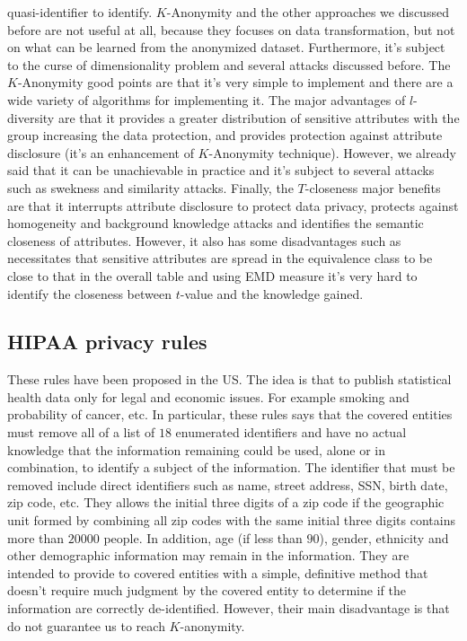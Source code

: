 quasi-identifier to identify. $K$-Anonymity and the other approaches we discussed before are not useful at all, because they focuses on data transformation, but not on what can be learned from the anonymized dataset. Furthermore, it's subject to the curse of dimensionality problem and several attacks discussed before. The $K$-Anonymity good points are that it's very simple to implement and there are a wide variety of algorithms for implementing it. The major advantages of $l$-diversity are that it provides a greater distribution of sensitive attributes with the group increasing the data protection, and provides protection against attribute disclosure (it's an enhancement of $K$-Anonymity technique). However, we already said that it can be unachievable in practice and it's subject to several attacks such as swekness and similarity attacks. Finally, the $T$-closeness major benefits are that it interrupts attribute disclosure to protect data privacy, protects against homogeneity and background knowledge attacks and identifies the semantic closeness of attributes. However, it also has some disadvantages such as necessitates that sensitive attributes are spread in the equivalence class to be close to that in the overall table and using EMD measure it's very hard to identify the closeness between $t$-value and the knowledge gained.

\subsection{HIPAA privacy rules}
These rules have been proposed in the US. The idea is that to publish statistical health data only for legal and economic issues. For example smoking and probability of cancer, etc. In particular, these rules says that the covered entities must remove all of a list of $18$ enumerated identifiers and have no actual knowledge that the information remaining could be used, alone or in combination, to identify a subject of the information. The identifier that must be removed include direct identifiers such as name, street address, SSN, birth date, zip code, etc. They allows the initial three digits of a zip code if the geographic unit formed by combining all zip codes with the same initial three digits contains more than $20000$ people. In addition, age (if less than $90$), gender, ethnicity and other demographic information may remain in the information. They are intended to provide to covered entities with a simple, definitive method that doesn't require much judgment by the covered entity to determine if the information are correctly de-identified. However, their main disadvantage is that do not guarantee us to reach $K$-anonymity.

